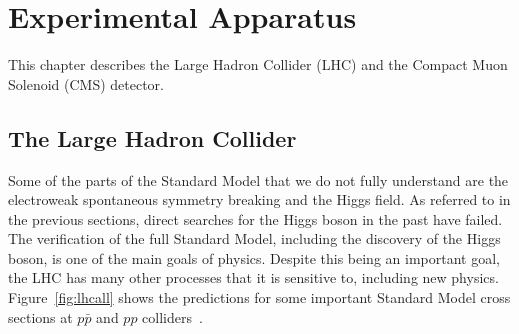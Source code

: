 

\chapter{Experimental Apparatus}

This chapter describes the Large Hadron Collider (LHC) and the Compact Muon Solenoid (CMS) detector.


\section{The Large Hadron Collider}

Some of the parts of the Standard Model that we do not fully understand are the electroweak spontaneous symmetry breaking and the Higgs field.  As referred to in the previous sections, direct searches for the Higgs boson in the past have failed. The verification of the full Standard Model, including the discovery of the Higgs boson, is one of the main goals of physics.  Despite this being an important goal, the LHC has many other processes that it is sensitive to, including new physics. Figure~\ref{fig:lhcall} shows the predictions for some important Standard Model cross sections at  $p \bar p$ and  $pp$  colliders~\cite{Campbell:2006wx}. 

